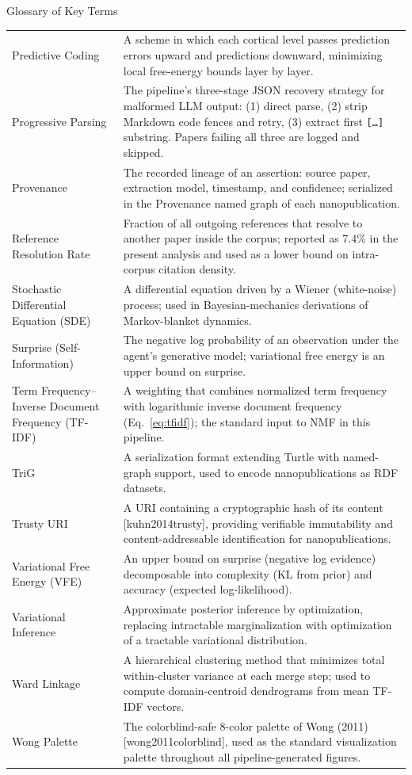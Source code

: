 \documentclass[
  ignorenonframetext,
]{beamer}
\providecommand{\citep}[1]{[#1]}
\begin{document}
\begin{frame}[allowframebreaks]{Glossary of Key Terms}
\begin{longtable}{p{4cm}p{11cm}}
Predictive Coding & A scheme in which each cortical level passes prediction errors upward and predictions downward, minimizing local free-energy bounds layer by layer. \\
Progressive Parsing & The pipeline's three-stage JSON recovery strategy for malformed LLM output: (1) direct parse, (2) strip Markdown code fences and retry, (3) extract first \texttt{[\ldots]} substring. Papers failing all three are logged and skipped. \\
Provenance & The recorded lineage of an assertion: source paper, extraction model, timestamp, and confidence; serialized in the Provenance named graph of each nanopublication. \\
Reference Resolution Rate & Fraction of all outgoing references that resolve to another paper inside the corpus; reported as 7.4\% in the present analysis and used as a lower bound on intra-corpus citation density. \\
Stochastic Differential Equation (SDE) & A differential equation driven by a Wiener (white-noise) process; used in Bayesian-mechanics derivations of Markov-blanket dynamics. \\
Surprise (Self-Information) & The negative log probability of an observation under the agent's generative model; variational free energy is an upper bound on surprise. \\
Term Frequency--Inverse Document Frequency (TF-IDF) & A weighting that combines normalized term frequency with logarithmic inverse document frequency (Eq.~\ref{eq:tfidf}); the standard input to NMF in this pipeline. \\
TriG & A serialization format extending Turtle with named-graph support, used to encode nanopublications as RDF datasets. \\
Trusty URI & A URI containing a cryptographic hash of its content \citep{kuhn2014trusty}, providing verifiable immutability and content-addressable identification for nanopublications. \\
Variational Free Energy (VFE) & An upper bound on surprise (negative log evidence) decomposable into complexity (KL from prior) and accuracy (expected log-likelihood). \\
Variational Inference & Approximate posterior inference by optimization, replacing intractable marginalization with optimization of a tractable variational distribution. \\
Ward Linkage & A hierarchical clustering method that minimizes total within-cluster variance at each merge step; used to compute domain-centroid dendrograms from mean TF-IDF vectors. \\
Wong Palette & The colorblind-safe 8-color palette of Wong (2011) \citep{wong2011colorblind}, used as the standard visualization palette throughout all pipeline-generated figures. \\
\end{longtable}

\FloatBarrier
\end{frame}
\end{document}
